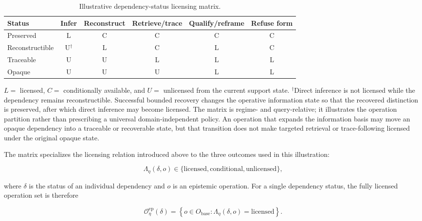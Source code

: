 \documentclass[11pt]{article}
\theoremstyle{definition}
\theoremstyle{remark}
\begin{document}
\begin{table}[ht]
\centering
\small
\caption{Illustrative dependency-status licensing matrix.}
\label{tab:dependency_status_answer_forms}
\begin{tabular}{lccccc}
\toprule
\textbf{Status}
& \textbf{Infer}
& \textbf{Reconstruct}
& \textbf{Retrieve/trace}
& \textbf{Qualify/reframe}
& \textbf{Refuse form} \\
\midrule
Preserved
& L & C & C & C & C \\

Reconstructible
& U$^\dagger$ & L & C & L & C \\

Traceable
& U & U & L & L & L \\

Opaque
& U & U & U & L & L \\
\bottomrule
\end{tabular}

\vspace{0.4em}
\begin{minipage}{0.94\linewidth}
\footnotesize
\(L=\) licensed, \(C=\) conditionally available, and \(U=\) unlicensed from the current support state.
\(^{\dagger}\)Direct inference is not licensed while the dependency remains reconstructible. Successful bounded recovery changes the operative information state so that the recovered distinction is preserved, after which direct inference may become licensed.
The matrix is regime- and query-relative; it illustrates the operation partition rather than prescribing a universal domain-independent policy. An operation that expands the information basis may move an opaque dependency into a traceable or recoverable state, but that transition does not make targeted retrieval or trace-following licensed under the original opaque state.
\end{minipage}
\end{table}

The matrix specializes the licensing relation introduced above to the three outcomes used in this illustration:

\[
\Lambda_{\eta}(\delta,o) \in \{\text{licensed},\text{conditional},\text{unlicensed}\},
\]

where \(\delta\) is the status of an individual dependency and \(o\) is an epistemic operation. For a single dependency status, the fully licensed operation set is therefore

\[
\mathcal{O}^{\mathrm{ep}}_{\eta}(\delta)
=
\left\{
o\in O_{\mathrm{base}}
:
\Lambda_{\eta}(\delta,o)=\text{licensed}
\right\}.
\]
\end{document}
